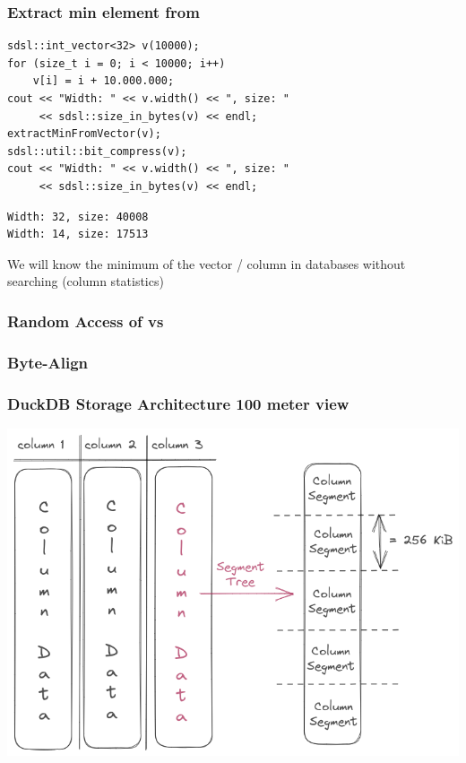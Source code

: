 \documentclass{beamer}
\begin{document}
\begin{frame}[fragile]
    \frametitle{Extract min element from }
\begin{lstlisting}[style=C++]
sdsl::int_vector<32> v(10000);
for (size_t i = 0; i < 10000; i++) 
    v[i] = i + 10.000.000;
cout << "Width: " << v.width() << ", size: " 
     << sdsl::size_in_bytes(v) << endl;
extractMinFromVector(v);
sdsl::util::bit_compress(v);
cout << "Width: " << v.width() << ", size: " 
     << sdsl::size_in_bytes(v) << endl;
\end{lstlisting}

\begin{lstlisting}[style=shell]
Width: 32, size: 40008
Width: 14, size: 17513
\end{lstlisting}

\pause
We will know the minimum of the vector / column in databases without searching 
(column statistics)
\end{frame}


\begin{frame}[fragile]
    \frametitle{Random Access of  vs }

\end{frame}

\begin{frame}
    \frametitle{Byte-Align }
\end{frame}


\begin{frame}
    \frametitle{DuckDB Storage Architecture 100 meter view}
    \includegraphics[width=\framewidth]{figures/excalidraw/duckdb-high-level-storage-arch.png}
\end{frame}
\end{document}
